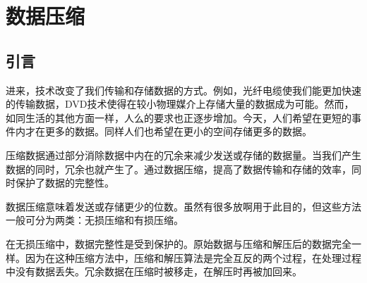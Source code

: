 \chapter{数据压缩}
\section{引言}
进来，技术改变了我们传输和存储数据的方式。例如，光纤电缆使我们能更加快速的传输数据，DVD技术使得在较小物理媒介上存储大量的数据成为可能。然而，如同生活的其他方面一样，人么的要求也正逐步增加。今天，人们希望在更短的事件内才在更多的数据。同样人们也希望在更小的空间存储更多的数据。 

压缩数据通过部分消除数据中内在的冗余来减少发送或存储的数据量。当我们产生数据的同时，冗余也就产生了。通过数据压缩，提高了数据传输和存储的效率，同时保护了数据的完整性。 

数据压缩意味着发送或存储更少的位数。虽然有很多放啊用于此目的，但这些方法一般可分为两类：无损压缩和有损压缩。 

在无损压缩中，数据完整性是受到保护的。原始数据与压缩和解压后的数据完全一样。因为在这种压缩方法中，压缩和解压算法是完全互反的两个过程，在处理过程中没有数据丢失。冗余数据在压缩时被移走，在解压时再被加回来。
